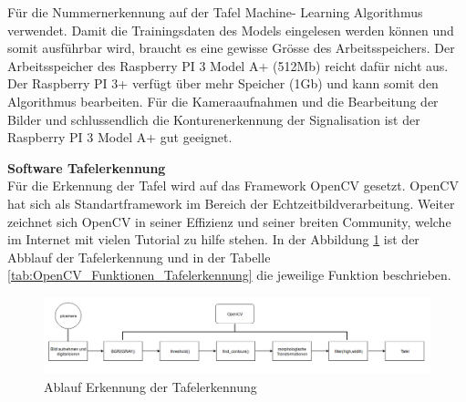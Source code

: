 \documentclass[../../main.tex]{subfiles}
\begin{document}
    Für die Nummernerkennung auf der Tafel Machine- Learning Algorithmus verwendet. Damit die Trainingsdaten des Models eingelesen werden können und somit ausführbar wird, braucht es eine gewisse Grösse des Arbeitsspeichers. Der Arbeitsspeicher des Raspberry PI 3 Model A+ (512Mb) reicht dafür nicht aus. Der Raspberry PI 3+ verfügt über mehr Speicher (1Gb) und kann somit den Algorithmus bearbeiten. Für die Kameraaufnahmen und die Bearbeitung der Bilder und schlussendlich die Konturenerkennung der Signalisation ist der Raspberry PI 3 Model A+  gut geeignet.
    \pagebreak

    \textbf{Software Tafelerkennung}\\
    Für die Erkennung der Tafel wird auf das Framework OpenCV gesetzt. OpenCV hat sich als Standartframework im Bereich der Echtzeitbildverarbeitung. Weiter zeichnet sich OpenCV in seiner Effizienz und seiner breiten Community, welche im Internet mit vielen Tutorial zu hilfe stehen. In der Abbildung \ref{fig:ablauf_tafelerkennung} ist der Abblauf der Tafelerkennung und in der Tabelle \ref{tab:OpenCV_Funktionen_Tafelerkennung} die jeweilige Funktion beschrieben.



    \begin{figure}[H] %
        \centering
        \includegraphics[width=1\textwidth]{Ablauf_Tafelerkennung.png}
        \caption{Ablauf Erkennung der Tafelerkennung}
        \label{fig:ablauf_tafelerkennung}
    \end{figure}
\end{document}
